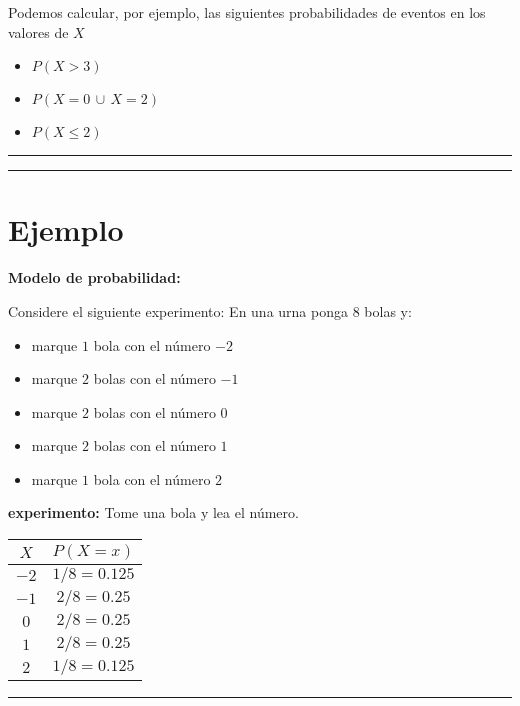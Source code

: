 \documentclass[
]{book}
\providecommand{\tightlist}{%
  \setlength{\itemsep}{0pt}\setlength{\parskip}{0pt}}
\begin{document}
Podemos calcular, por ejemplo, las siguientes probabilidades de eventos en los valores de \(X\)

\begin{itemize}
\tightlist
\item
  \(P(X>3)\)
\item
  \(P(X=0\, \cup\, X=2 )\)
\item
  \(P(X \leq 2)\)
\end{itemize}

\begin{center}\rule{0.5\linewidth}{0.5pt}\end{center}

\begin{center}\rule{0.5\linewidth}{0.5pt}\end{center}

\hypertarget{ejemplo-6}{%
\section{Ejemplo}\label{ejemplo-6}}

\textbf{Modelo de probabilidad:}

Considere el siguiente experimento: En una urna ponga \(8\) bolas y:

\begin{itemize}
\tightlist
\item
  marque \(1\) bola con el número \(-2\)
\item
  marque \(2\) bolas con el número \(-1\)
\item
  marque \(2\) bolas con el número \(0\)
\item
  marque \(2\) bolas con el número \(1\)
\item
  marque \(1\) bola con el número \(2\)
\end{itemize}

\textbf{experimento:} Tome una bola y lea el número.

\begin{longtable}[]{@{}cc@{}}
\toprule
\(X\) & \(P(X=x)\) \\
\midrule
\endhead
\(-2\) & \(1/8=0.125\) \\
\(-1\) & \(2/8=0.25\) \\
\(0\) & \(2/8=0.25\) \\
\(1\) & \(2/8=0.25\) \\
\(2\) & \(1/8=0.125\) \\
\bottomrule
\end{longtable}

\begin{center}\rule{0.5\linewidth}{0.5pt}\end{center}
\end{document}
